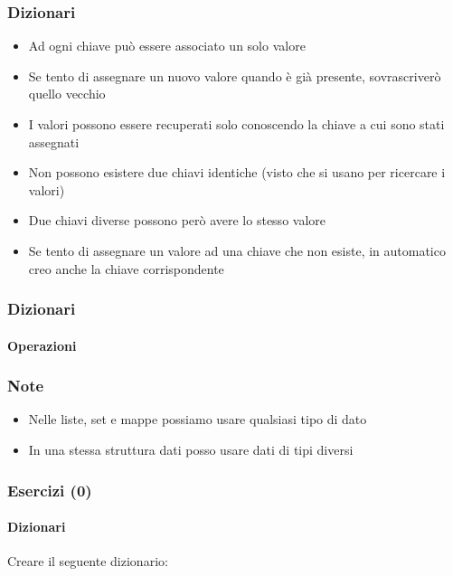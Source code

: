 \begin{contentframe}
    \frametitle{Dizionari}

    \begin{itemize}
        \item Ad ogni chiave può essere associato un solo valore
        \item Se tento di assegnare un nuovo valore quando è già presente, sovrascriverò quello vecchio

        \bigskip
        \item I valori possono essere recuperati solo conoscendo la chiave a cui sono stati assegnati

        \bigskip
        \item Non possono esistere due chiavi identiche (visto che si usano per ricercare i valori)
        \item Due chiavi diverse possono però avere lo stesso valore 

        \bigskip
        \item Se tento di assegnare un valore ad una chiave che non esiste, in automatico creo anche la chiave corrispondente 
    \end{itemize}
\end{contentframe}

\begin{contentframe}
    \frametitle{Dizionari}
    \framesubtitle{Operazioni}

\end{contentframe}

\begin{exampleframe}
    \frametitle{Note}

    \begin{itemize}
        \item Nelle liste, set e mappe possiamo usare qualsiasi tipo di dato

        \bigskip
        \item In una stessa struttura dati posso usare dati di tipi diversi
            
    \end{itemize}
\end{exampleframe}

\begin{exerciseframe}
    \frametitle{Esercizi (0)}
    \framesubtitle{Dizionari}

    Creare il seguente dizionario:
    
    \bigskip
\end{exerciseframe}

